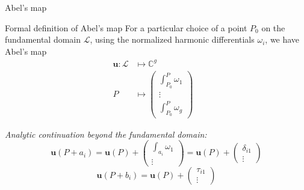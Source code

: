 \documentclass[11pt,aspectratio=169]{beamer}
\begin{document}
\begin{frame}{Abel's map}
    \begin{block}{Formal definition of Abel's map}
        For a particular choice of a point $P_0$ on the fundamental domain $\mathcal L$, using the normalized harmonic differentials $\omega_i$, we have Abel's map
        \begin{align*}
            \mathbf{u} : \mathcal L & \mapsto \mathbb{C}^g & \\
            P & \mapsto \begin{pmatrix} \int_{P_0}^P \omega_1 \\ \vdots \\ \int_{P_0}^P \omega_g \end{pmatrix} &
        \end{align*}
    \end{block}

    \emph{Analytic continuation beyond the fundamental domain:}
    \[\mathbf{u}(P+a_i) = \mathbf{u}(P) + \begin{pmatrix} \int_{a_i} \omega_1 \\ \vdots \end{pmatrix} = \mathbf{u}(P) + \begin{pmatrix} \delta_{i1} \\ \vdots \end{pmatrix}\]
    \[\mathbf{u}(P+b_i) = \mathbf{u}(P) + \begin{pmatrix} \tau_{i1} \\ \vdots \end{pmatrix}\]
\end{frame}
\end{document}
